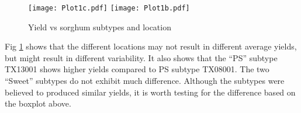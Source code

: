 \begin{figure}[H]
\centering
\texttt{[image: Plot1c.pdf]}
\texttt{[image: Plot1b.pdf]}
\caption{Yield vs sorghum subtypes and location}
\label{fig:Fig2}
\end{figure}

Fig \ref{fig:Fig2} shows that the different locations may not result in different average yields, but might result in different variability. It also shows that the ``PS'' subtype TX13001 shows higher yields compared to PS subtype TX08001. The two ``Sweet'' subtypes do not exhibit much difference. Although the subtypes were believed to produced similar yields, it is worth testing for the difference based on the boxplot above. 


